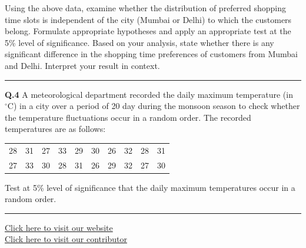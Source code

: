 \documentclass[11pt,a4paper]{article}
\begin{document}
Using the above data, examine whether the distribution of preferred shopping time slots is independent of the city (Mumbai or Delhi) to which the customers belong. Formulate appropriate hypotheses and apply an appropriate test at the 5\% level of significance. Based on your analysis, state whether there is any significant difference in the shopping time preferences of customers from Mumbai and Delhi. Interpret your result in context.

\medskip\rule{\linewidth}{0.2pt}\medskip




\noindent   \textbf{Q.4} A meteorological department recorded the daily maximum temperature (in $^\circ \text{C}$) in a city over a period of 20 day during the monsoon season to check whether the temperature fluctuations occur in a random order. The recorded temperatures are as follows:


\begin{center}

\begin{tabular}{cccccccccc}
28 & 31 & 27 & 33 & 29 & 30 & 26 & 32 & 28 & 31 \\
27 & 33 & 30 & 28 & 31 & 26 & 29 & 32 & 27 & 30 \\
\end{tabular}
\end{center}

Test at 5\% level of significance that the daily maximum temperatures occur in a random order.

\vfill
\rule{\linewidth}{0.4pt}

\begin{center}\small
\href{https://bhu-exam.vercel.app/}{Click here to visit our website}\\[4pt]
\href{https://me-aryan.vercel.app/}{Click here to visit our contributor}
\end{center}
\end{document}
